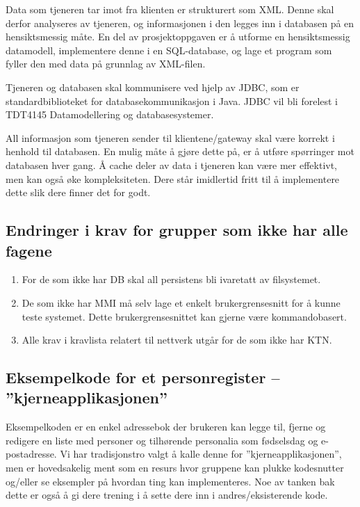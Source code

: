 Data som tjeneren tar imot fra klienten er strukturert som XML. Denne skal derfor analyseres av tjeneren, og informasjonen i den legges inn i databasen på en hensiktsmessig måte. En del av prosjektoppgaven er å utforme en hensiktsmessig datamodell, implementere denne i en SQL-database, og lage et program som fyller den med data på grunnlag av XML-filen. 

Tjeneren og databasen skal kommunisere ved hjelp av JDBC, som er standardbiblioteket for databasekommunikasjon i Java. JDBC vil bli forelest i TDT4145 Datamodellering og databasesystemer.

All informasjon som tjeneren sender til klientene/gateway skal være korrekt i henhold til databasen. En mulig måte å gjøre dette på, er å utføre spørringer mot databasen hver gang. Å cache deler av data i tjeneren kan være mer effektivt, men kan også øke kompleksiteten. Dere står imidlertid fritt til å implementere dette slik dere finner det for godt.

\subsection{Endringer i krav for grupper som ikke har alle fagene}

\begin{enumerate}

\item
For de som ikke har DB skal all persistens bli ivaretatt av filsystemet. 

\item
De som ikke har MMI må selv lage et enkelt brukergrensesnitt for å kunne teste systemet. Dette brukergrensesnittet kan gjerne være kommandobasert. 

\item
Alle krav i kravlista relatert til nettverk utgår for de som ikke har KTN. 

\end{enumerate}

\subsection{Eksempelkode for et personregister – ”kjerneapplikasjonen”}

Eksempelkoden er en enkel adressebok der brukeren kan legge til, fjerne og redigere en liste med personer og tilhørende personalia som fødselsdag og e-postadresse. Vi har tradisjonstro valgt å kalle denne for ”kjerneapplikasjonen”, men er hovedsakelig ment som en resurs hvor gruppene kan plukke kodesnutter og/eller se eksempler på hvordan ting kan implementeres. Noe av tanken bak dette er også å gi dere trening i å sette dere inn i andres/eksisterende kode.


